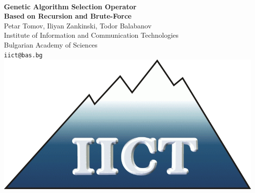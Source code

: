 \documentclass[a0,portrait,25pt]{sciposter}
\begin{document}
\pagecolor{LightGray}

\begin{mdframed}[backgroundcolor=white,roundcorner=4pt,shadow=true,linewidth=1pt]
\begin{minipage}[b]{1.44  \linewidth}
\begin{multicols}{2} \ \color{DimGray}

\Huge \textbf{Genetic Algorithm Selection Operator \\ Based on Recursion and Brute-Force} \\ [0.4cm]
\Large {Petar Tomov, Iliyan Zankinski, Todor Balabanov} \\ [0.4cm]
\huge Institute of Information and Communication Technologies \\ Bulgarian Academy of Sciences \\ [0.4cm]
\Large \texttt{iict@bas.bg} \\ [1.4cm]

\includegraphics[width=20cm]{logo-iict-en}
\end{multicols}
\end{minipage}
\end{mdframed}

\vspace{0.5cm}
\end{document}
